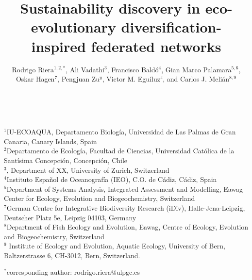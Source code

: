 \documentclass[12pt,a4paper]{article}
\begin{document}
\title{Sustainability discovery in eco-evolutionary diversification-inspired federated networks}%

\maketitle
\noindent \author{Rodrigo Riera$^{1,2,*}$, Ali Vadathi$^{3}$, Francisco Bald\'o$^{4}$, Gian Marco Palamara$^{5,6}$, Oskar Hagen$^{7}$, Pengjuan Zu$^{y}$, Victor M. Egu\'iluz$^{z}$, and Carlos J. Meli\'an$^{8,9}$}
            \\
            
            \vspace{0.25 in}
            
  \noindent  $^{1}$IU-ECOAQUA, Departamento Biolog\'ia, Universidad de Las Palmas de Gran Canaria, Canary Islands, Spain\\
  $^{2}$Departamento de Ecolog\'ia, Facultad de Ciencias, Universidad Cat\'olica de la Sant\'isima Concepci\'on, Concepci\'on, Chile\\
  $^{3}$, Department of XX, University of Zurich, Switzerland\\
  $^{4}$Instituto Español de Oceanografía (IEO), C.O. de Cádiz, Cádiz, Spain\\
  $^{5}$Department of Systems Analysis, Integrated Assessment and Modelling, Eawag Center for Ecology, Evolution and Biogeochemistry, Switzerland\\
  $^{7}$German Centre for Integrative Biodiversity Research (iDiv), Halle-Jena-Leipzig, Deutscher Platz 5e, Leipzig 04103, Germany\\
  $^{8}$Department of Fish Ecology and Evolution, Eawag, Centre of Ecology, Evolution and Biogeochemistry, Switzerland\\
  $^{9}$ Institute of Ecology and Evolution, Aquatic Ecology, University of Bern, Baltzerstrasse 6, CH-3012, Bern, Switzerland.\\
\vspace{0.25 in}

  $^{*}$corresponding author: rodrigo.riera@ulpgc.es
\end{document}
